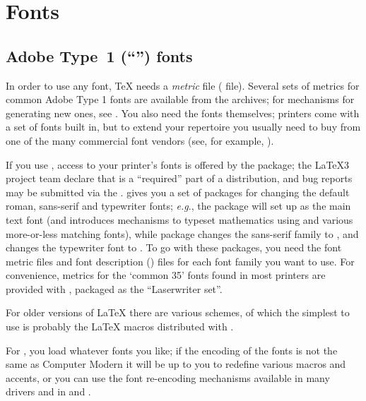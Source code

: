 
\section{Fonts}

\subsection{Adobe Type~1 (``\PS{}'') fonts}


In order to use any font, \TeX{} needs a
\emph{metric} file ( file).  Several sets of metrics for
common Adobe Type 1 fonts are
available from the archives; for mechanisms for generating new ones,
see .  You
also need the fonts themselves; \PS{} printers come with a set of
fonts built in, but to extend your repertoire you usually
need to buy from one of the many commercial font vendors (see, for
example, ).

If you use \LaTeXe{}, access to your printer's fonts is offered by the
 package; the \LaTeX{}3 project team declare that
 is a ``required'' part of a \latex{} distribution, and
bug reports may be submitted via the %
. 
 gives you a set of packages for changing the default
roman, sans-serif and typewriter fonts; \emph{e.g}., the
 package will set up 
 as the main text font (and introduces mechanisms to
typeset mathematics using  and various more-or-less
matching fonts),  while package  changes the sans-serif
family to , and  changes the
typewriter font to .  To go with these
packages, you need the font metric files
and font description () files for each font family you
want to use.  For convenience,
metrics for the `common 35' \PS{} fonts found in most \PS{} printers
are provided with , packaged as the ``Laserwriter set''.

For older versions of \LaTeX{} there are various schemes, of which the
simplest to use is probably the \LaTeX{} macros distributed with
.

For \plaintex{}, you load whatever fonts you like; if the encoding of
the fonts is not the same as Computer Modern it will be up to you to
redefine various macros and accents, or you can use the font
re-encoding mechanisms available in many drivers and in
 and .

